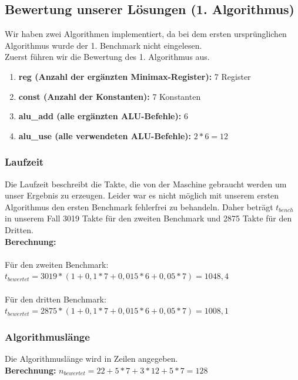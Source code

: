 \documentclass[12pt,titlepage]{article}
\begin{document}
\newpage

\subsection{Bewertung unserer Lösungen (1. Algorithmus)}

Wir haben zwei Algorithmen implementiert, da bei dem ersten ursprünglichen Algorithmus wurde der 1. Benchmark nicht eingelesen.\\

Zuerst führen wir die Bewertung des 1. Algorithmus aus.

\begin{enumerate}
\item \textbf{reg (Anzahl der ergänzten Minimax-Register): } 7 Register
\item \textbf{const (Anzahl der Konstanten): } 7 Konstanten
\item \textbf{alu\_add (alle erg{\"a}nzten ALU-Befehle):} 6 
\item \textbf{alu\_use (alle verwendeten ALU-Befehle):} $2*6 = 12$
\end{enumerate}

\subsubsection{Laufzeit}
Die Laufzeit beschreibt die Takte, die von der Maschine gebraucht werden um unser Ergebnis zu erzeugen. Leider war es nicht möglich mit unserem ersten Algorithmus den ersten Benchmark fehlerfrei zu behandeln. Daher beträgt $t_{bench}$ in unserem Fall 3019 Takte für den zweiten Benchmark und 2875 Takte für den Dritten.\\

\textbf{Berechnung:}\\\\
Für den zweiten Benchmark: $t_{bewertet} = 3019 * (1 + 0,1*7 + 0,015*6 + 0,05 * 7) = 1048,4$\\\\
Für den dritten Benchmark: $t_{bewertet} = 2875 * (1 + 0,1*7 + 0,015*6 + 0,05 * 7) = 1008,1$\\

\subsubsection{Algorithmuslänge}
Die Algorithmuslänge wird in Zeilen angegeben.\\

\textbf{Berechnung:} $n_{bewertet} = 22 + 5*7 + 3*12 + 5*7 = 128$
\end{document}
